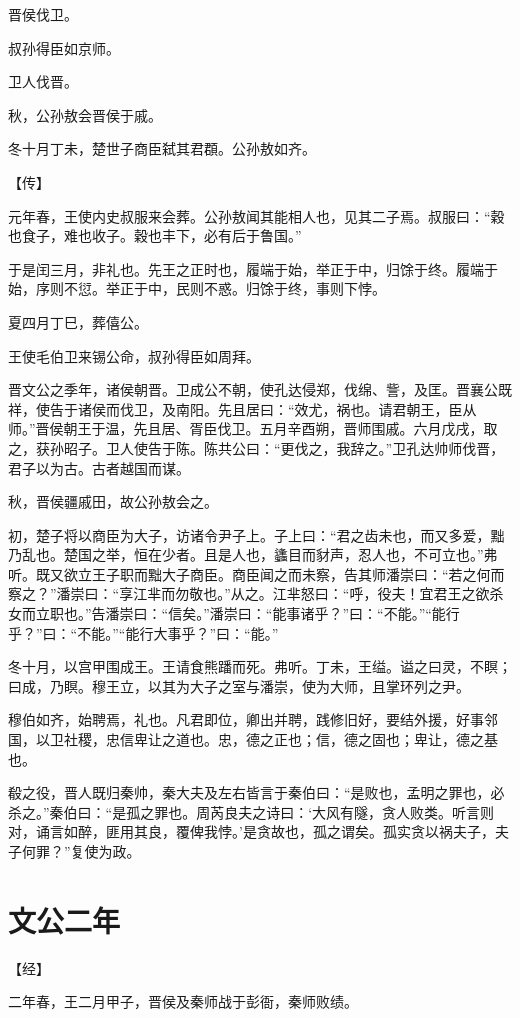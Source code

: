 \documentclass[a4paper,12pt,UTF8,twoside]{ctexbook}
\begin{document}
晋侯伐卫。

叔孙得臣如京师。

卫人伐晋。

秋，公孙敖会晋侯于戚。

冬十月丁未，楚世子商臣弑其君頵。公孙敖如齐。

【传】

元年春，王使内史叔服来会葬。公孙敖闻其能相人也，见其二子焉。叔服曰：“穀也食子，难也收子。穀也丰下，必有后于鲁国。”

于是闰三月，非礼也。先王之正时也，履端于始，举正于中，归馀于终。履端于始，序则不愆。举正于中，民则不惑。归馀于终，事则下悖。

夏四月丁巳，葬僖公。

王使毛伯卫来锡公命，叔孙得臣如周拜。

晋文公之季年，诸侯朝晋。卫成公不朝，使孔达侵郑，伐绵、訾，及匡。晋襄公既祥，使告于诸侯而伐卫，及南阳。先且居曰：“效尤，祸也。请君朝王，臣从师。”晋侯朝王于温，先且居、胥臣伐卫。五月辛酉朔，晋师围戚。六月戊戌，取之，获孙昭子。卫人使告于陈。陈共公曰：“更伐之，我辞之。”卫孔达帅师伐晋，君子以为古。古者越国而谋。

秋，晋侯疆戚田，故公孙敖会之。

初，楚子将以商臣为大子，访诸令尹子上。子上曰：“君之齿未也，而又多爱，黜乃乱也。楚国之举，恒在少者。且是人也，蠭目而豺声，忍人也，不可立也。”弗听。既又欲立王子职而黜大子商臣。商臣闻之而未察，告其师潘崇曰：“若之何而察之？”潘崇曰：“享江芈而勿敬也。”从之。江芈怒曰：“呼，役夫！宜君王之欲杀女而立职也。”告潘崇曰：“信矣。”潘崇曰：“能事诸乎？”曰：“不能。”“能行乎？”曰：“不能。”“能行大事乎？”曰：“能。”

冬十月，以宫甲围成王。王请食熊蹯而死。弗听。丁未，王缢。谥之曰灵，不瞑；曰成，乃瞑。穆王立，以其为大子之室与潘崇，使为大师，且掌环列之尹。

穆伯如齐，始聘焉，礼也。凡君即位，卿出并聘，践修旧好，要结外援，好事邻国，以卫社稷，忠信卑让之道也。忠，德之正也；信，德之固也；卑让，德之基也。

殽之役，晋人既归秦帅，秦大夫及左右皆言于秦伯曰：“是败也，孟明之罪也，必杀之。”秦伯曰：“是孤之罪也。周芮良夫之诗曰：‘大风有隧，贪人败类。听言则对，诵言如醉，匪用其良，覆俾我悖。’是贪故也，孤之谓矣。孤实贪以祸夫子，夫子何罪？”复使为政。

\section{文公二年}


【经】

二年春，王二月甲子，晋侯及秦师战于彭衙，秦师败绩。
\end{document}
